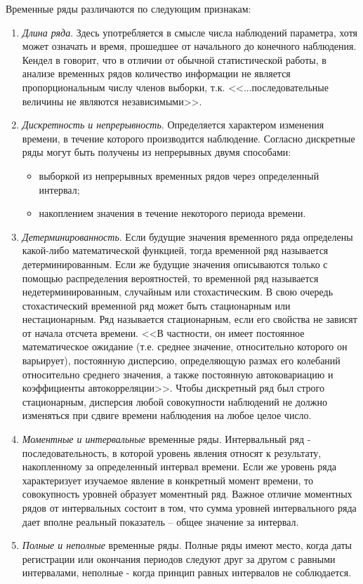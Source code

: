 Временные ряды различаются по следующим признакам:
\begin{enumerate}
	\item \textit{Длина ряда}. Здесь употребляется в смысле числа наблюдений параметра, хотя может означать и время, прошедшее от начального до конечного наблюдения. Кендел в \cite{kendel} говорит, что в отличии от обычной статистической работы, в анализе временных рядов количество информации не является пропорциональным числу членов выборки, т.к. <<...последовательные величины не являются независимыми>>.
	\item \textit{Дискретность и непрерывность}. Определяется характером изменения времени,  в течение которого производится наблюдение. Согласно дискретные ряды могут быть получены из непрерывных двумя способами:
	\begin{itemize}
		\item выборкой из непрерывных временных рядов через определенный интервал;
		\item накоплением значения в течение некоторого периода времени.	
	\end{itemize} 
	\item \textit{Детерминированность}. Если будущие значения временного ряда определены какой-либо математической
 функцией, тогда временной ряд называется детерминированным. Если же будущие значения описываются только с помощью
 распределения вероятностей, то временной ряд называется недетерминированным, случайным или стохастическим.
 В свою очередь стохастический временной ряд может быть стационарным или нестационарным. Ряд называется стационарным, если его свойства не зависят от начала отсчета времени. <<В частности, он имеет постоянное математическое ожидание (т.е. среднее
  значение, относительно которого он варьирует), постоянную дисперсию, определяющую размах его колебаний относительно
   среднего значения, а также постоянную автоковариацию и коэффициенты автокорреляции>>.
 Чтобы дискретный ряд был строго стационарным, дисперсия любой совокупности наблюдений не должно изменяться при сдвиге
 времени наблюдения на любое целое число.
	\item \textit{Моментные и интервальные} временные ряды. Интервальный ряд - последовательность, в которой уровень
явления относят к результату, накопленному за определенный интервал времени. Если же уровень
ряда характеризует изучаемое явление в конкретный момент времени, то совокупность уровней образует моментный ряд.
 Важное отличие моментных рядов от интервальных состоит в том, что сумма уровней интервального ряда дает вполне
 реальный показатель --  общее значение за интервал.
	\item \textit{Полные и неполные} временные ряды. Полные ряды имеют место, когда даты регистрации или окончания 
периодов следуют друг за другом с равными интервалами, неполные - когда принцип равных интервалов не 
 соблюдается.
\end{enumerate}


